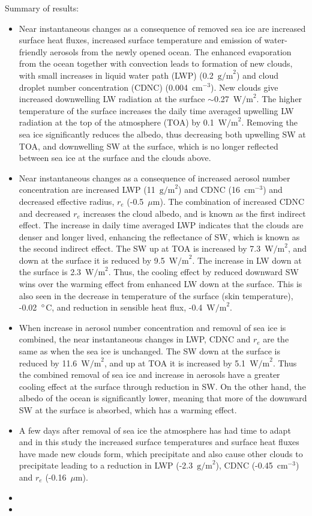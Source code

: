 Summary of results:
\begin{itemize}
\item Near instantaneous changes as a consequence of removed sea ice are increased surface heat fluxes, increased surface temperature and emission of water-friendly aerosols from the newly opened ocean. The enhanced evaporation from the ocean together with convection leads to formation of new clouds, with small increases in liquid water path (LWP) (0.2~$\text{g/m}^2$) and cloud droplet number concentration (CDNC) (0.004~$\text{cm}^{-3}$). New clouds give increased downwelling LW radiation at the surface $\sim$0.27~$\text{W/m}^2$. The higher temperature of the surface increases the daily time averaged upwelling LW radiation at the top of the atmosphere (TOA) by 0.1~$\text{W/m}^2$. Removing the sea ice significantly reduces the albedo, thus decreasing both upwelling SW at TOA, and downwelling SW at the surface, which is no longer reflected between sea ice at the surface and the clouds above.
\item Near instantaneous changes as a consequence of increased aerosol number concentration are increased LWP (11~$\text{g/m}^2$) and CDNC (16~$\text{cm}^{-3}$) and decreased effective radius, $r_e$ (-0.5~$\mu\text{m}$). The combination of increased CDNC and decreased $r_e$ increases the cloud albedo, and is known as the first indirect effect. The increase in daily time averaged LWP indicates that the clouds are denser and longer lived, enhancing the reflectance of SW, which is known as the second indirect effect. The SW up at TOA is increased by 7.3~$\text{W/m}^2$, and down at the surface it is reduced by 9.5~$\text{W/m}^2$. The increase in LW down at the surface is 2.3~$\text{W/m}^2$. Thus, the cooling effect by reduced downward SW wins over the warming effect from enhanced LW down at the surface. This is also seen in the decrease in temperature of the surface (skin temperature), -0.02~$\degree$C, and reduction in sensible heat flux, -0.4~$\text{W/m}^2$.
\item When increase in aerosol number concentration and removal of sea ice is combined, the near instantaneous changes in LWP, CDNC and $r_e$ are the same as when the sea ice is unchanged. The SW down at the surface is reduced by 11.6~$\text{W/m}^2$, and up at TOA it is increased by 5.1~$\text{W/m}^2$. Thus the combined removal of sea ice and increase in aerosols have a greater cooling effect at the surface through reduction in SW. On the other hand, the albedo of the ocean is significantly lower, meaning that more of the downward SW at the surface is absorbed, which has a warming effect.
\item A few days after removal of sea ice the atmosphere has had time to adapt and in this study the increased surface temperatures and surface heat fluxes have made new clouds form, which precipitate and also cause other clouds to precipitate leading to a reduction in LWP (-2.3~$\text{g/m}^2$), CDNC (-0.45~$\text{cm}^{-3}$) and $r_e$ (-0.16~$\mu\text{m}$).
\item 
\item 
\end{itemize}

